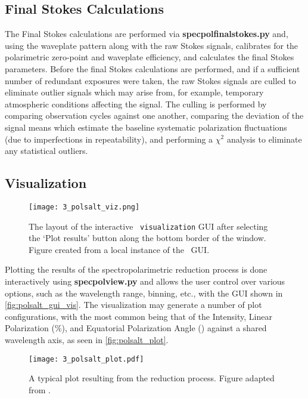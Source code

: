 \subsection{Final Stokes Calculations} \label{subsec:pol_fstokes}

The Final Stokes calculations are performed via \textbf{specpolfinalstokes.py} and, using the waveplate pattern along with the raw Stokes signals, calibrates for the polarimetric zero-point and waveplate efficiency, and calculates the final Stokes parameters.
Before the final Stokes calculations are performed, and if a sufficient number of redundant exposures were taken, the raw Stokes signals are culled to eliminate outlier signals which may arise from, for example, temporary atmospheric conditions affecting the signal.
The culling is performed by comparing observation cycles against one another, comparing the deviation of the signal means which estimate the baseline systematic polarization fluctuations (due to imperfections in repeatability), and performing a $\chi^2$ analysis to eliminate any statistical outliers.

\subsection{Visualization} \label{subsec:pol_viz}

\begin{figure}[t]
    \centering
    \texttt{[image: 3\_polsalt\_viz.png]}
    \caption{
        The layout of the interactive \polsalt\ \texttt{visualization} \gls{GUI} after selecting the `Plot results' button along the bottom border of the window.
        Figure created from a local instance of the \polsalt\ \gls{GUI}.
    }
    \label{fig:polsalt_gui_vis}
\end{figure}

Plotting the results of the spectropolarimetric reduction process is done interactively using \textbf{specpol\-view.py} and allows the user control over various options, such as the wavelength range, binning, etc., with the \gls{GUI} shown in \autoref{fig:polsalt_gui_vis}.
The visualization may generate a number of plot configurations, with the most common being that of the Intensity, Linear Polarization ($\%$), and Equatorial Polarization Angle (\degree) against a shared wavelength axis, as seen in \autoref{fig:polsalt_plot}.

\begin{figure}[t]
    \centering
    \texttt{[image: 3\_polsalt\_plot.pdf]}
    \caption{
        A typical plot resulting from the reduction process.
        Figure adapted from \citep{Cooper_HEASA2021}.
    }
    \label{fig:polsalt_plot}
\end{figure}

